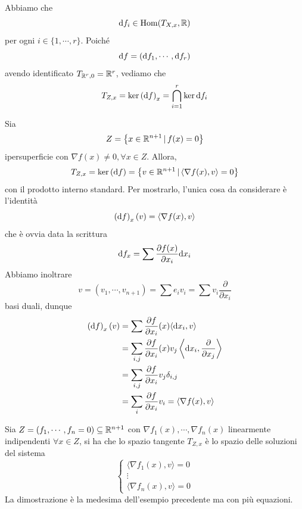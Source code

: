 \documentclass[a4paper]{article}
\begin{document}
\begin{snippetproof}{}
    Abbiamo che
    \[
        \text df_i \in \operatorname{Hom}(T_{X,x}, \mathbb{R})
    \]
    per ogni \(i \in \{1, \cdots, r\}\).
    Poiché \[
        \text df = (\text df_1, \cdots, \text df_r)
    \]
    avendo identificato \(T_{\mathbb{R}^r, 0} = \mathbb{R}^r\), vediamo che
    \[
        T_{Z,x} = \ker \left(\text df\right)_x
        = \bigcap_{i=1}^r \ker \text df_i
    \]
\end{snippetproof}

\begin{snippetexample}{}
    Sia \[
        Z = \left\{
            x \in \mathbb{R}^{n+1} \,|\, f(x) = 0
        \right\}
    \]
    ipersuperficie con \(\nabla f(x) \neq 0, \forall x \in Z\).
    Allora, 
    \[
        T_{Z,x} = \ker \left(\text df\right)
        = \left\{
            v \in \mathbb{R}^{n+1}
            \,|\, \langle \nabla f(x), v \rangle = 0
        \right\}
    \]
    con il prodotto interno standard.
    Per mostrarlo, l'unica cosa da considerare è l'identità
    \[
        \left(\text df\right)_x(v)
        = \langle \nabla f(x), v \rangle
    \]
    che è ovvia data la scrittura
    \[
        \text df_x = \sum \frac{\partial f(x)}{\partial x_i} \text dx_i
    \]
    Abbiamo inoltrare
    \[
        v = (v_1, \cdots, v_{n+1}) = \sum e_i v_i = \sum v_i \frac{\partial}{\partial x_i}
    \]
    basi duali, dunque \begin{align*}
        \left(\text df\right)_x(v) &=
        \sum \frac{\partial f}{\partial x_i}(x) \langle \text dx_i, v \rangle \\
        &= \sum_{i,j} \frac{\partial f}{\partial x_i}(x) v_j
        \left\langle \text dx_i, \frac{\partial}{\partial x_j} \right\rangle \\
        &= \sum_{i,j} \frac{\partial f}{\partial x_i} v_j \delta_{i,j} \\
        &= \sum_i \frac{\partial f}{\partial x_i} v_i = \langle \nabla f(x), v \rangle
    \end{align*}
\end{snippetexample}

\begin{snippetexample}{}
    Sia \(Z = (f_1, \cdots, f_n = 0) \subseteq \mathbb{R}^{n+1}\)
    con \(\nabla f_1(x), \cdots, \nabla f_n(x)\) linearmente indipendenti
    \(\forall x \in Z\), si ha che lo spazio tangente \(T_{Z,x}\)
    è lo spazio delle soluzioni del sistema
    \[
        \begin{cases}
            \langle \nabla f_1(x), v \rangle = 0 \\
            \vdots \\
            \langle \nabla f_n(x), v \rangle = 0
        \end{cases}
    \]
    La dimostrazione è la medesima dell'esempio precedente ma con più equazioni.
\end{snippetexample}
\end{document}
